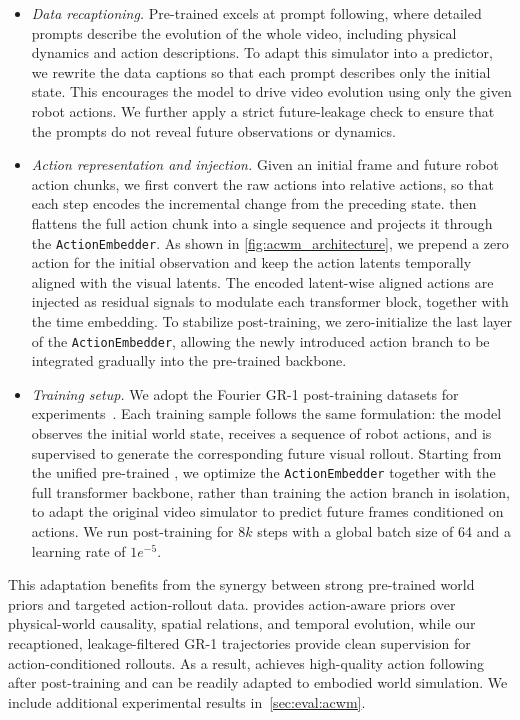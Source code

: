 \begin{itemize}
    \item \textit{Data recaptioning.} Pre-trained {\methodname} excels at prompt following, where detailed prompts describe the evolution of the whole video, including physical dynamics and action descriptions. To adapt this simulator into a predictor, we rewrite the data captions so that each prompt describes only the initial state. This encourages the model to drive video evolution using only the given robot actions. We further apply a strict future-leakage check to ensure that the prompts do not reveal future observations or dynamics.
    \item \textit{Action representation and injection.} Given an initial frame and future robot action chunks, we first convert the raw actions into relative actions, so that each step encodes the incremental change from the preceding state. \acwm then flattens the full action chunk into a single sequence and projects it through the \texttt{ActionEmbedder}. As shown in \cref{fig:acwm_architecture}, we prepend a zero action for the initial observation and keep the action latents temporally aligned with the visual latents. The encoded latent-wise aligned actions are injected as residual signals to modulate each transformer block, together with the time embedding. To stabilize post-training, we zero-initialize the last layer of the \texttt{ActionEmbedder}, allowing the newly introduced action branch to be integrated gradually into the pre-trained backbone.
    \item \textit{Training setup.} We adopt the Fourier GR-1 post-training datasets for experiments~\cite{gao2026dreamdojo}. Each training sample follows the same formulation: the model observes the initial world state, receives a sequence of robot actions, and is supervised to generate the corresponding future visual rollout. Starting from the unified pre-trained {\methodname}, we optimize the \texttt{ActionEmbedder} together with the full transformer backbone, rather than training the action branch in isolation, to adapt the original video simulator to predict future frames conditioned on actions. We run post-training for $8k$ steps with a global batch size of 64 and a learning rate of $1e^{-5}$.
\end{itemize}

This adaptation benefits from the synergy between strong pre-trained world priors and targeted action-rollout data. {\methodname} provides action-aware priors over physical-world causality, spatial relations, and temporal evolution, while our recaptioned, leakage-filtered GR-1 trajectories provide clean supervision for action-conditioned rollouts. As a result, \acwm achieves high-quality action following after post-training and can be readily adapted to embodied world simulation. We include additional experimental results in~\cref{sec:eval:acwm}.










